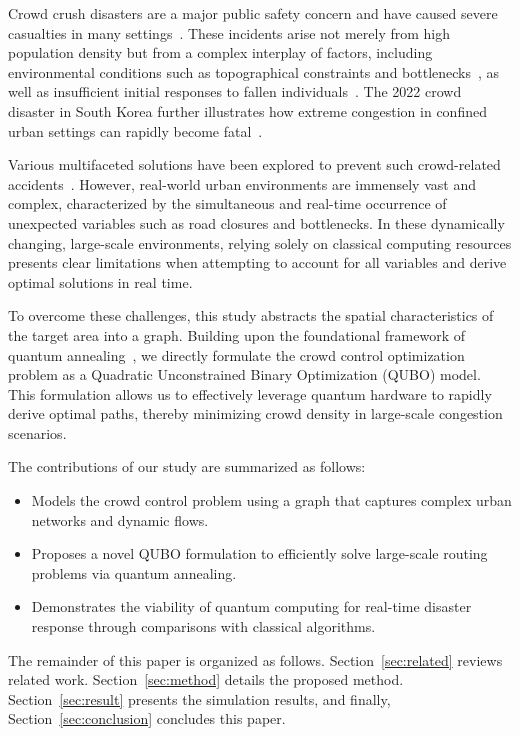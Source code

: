\documentclass[twocolumn,a4paper]{article}
\begin{document}
Crowd crush disasters are a major public safety concern and have caused severe casualties in many settings~\cite{fruin1993causes}. These incidents arise not merely from high population density but from a complex interplay of factors, including environmental conditions such as topographical constraints and bottlenecks~\cite{helbing2007dynamics}, as well as insufficient initial responses to fallen individuals~\cite{soomaroo2012disasters}. The 2022 crowd disaster in South Korea further illustrates how extreme congestion in confined urban settings can rapidly become fatal~\cite{chang2024crowd}.

Various multifaceted solutions have been explored to prevent such crowd-related accidents~\cite{Nishinari2024}. However, real-world urban environments are immensely vast and complex, characterized by the simultaneous and real-time occurrence of unexpected variables such as road closures and bottlenecks. In these dynamically changing, large-scale environments, relying solely on classical computing resources presents clear limitations when attempting to account for all variables and derive optimal solutions in real time.

To overcome these challenges, this study abstracts the spatial characteristics of the target area into a graph. Building upon the foundational framework of quantum annealing~\cite{Kadowaki1998}, we directly formulate the crowd control optimization problem as a Quadratic Unconstrained Binary Optimization (QUBO) model. This formulation allows us to effectively leverage quantum hardware to rapidly derive optimal paths, thereby minimizing crowd density in large-scale congestion scenarios.

The contributions of our study are summarized as follows:
\begin{itemize}
    \setlength{\itemsep}{0pt}
    \setlength{\parsep}{0pt}
    \setlength{\parskip}{0pt}
    \item[(1)] Models the crowd control problem using a graph that captures complex urban networks and dynamic flows.
    \item[(2)] Proposes a novel QUBO formulation to efficiently solve large-scale routing problems via quantum annealing.
    \item[(3)] Demonstrates the viability of quantum computing for real-time disaster response through comparisons with classical algorithms.
\end{itemize}

The remainder of this paper is organized as follows. Section~\ref{sec:related} reviews related work. Section~\ref{sec:method} details the proposed method. Section~\ref{sec:result} presents the simulation results, and finally, Section~\ref{sec:conclusion} concludes this paper.
\end{document}
